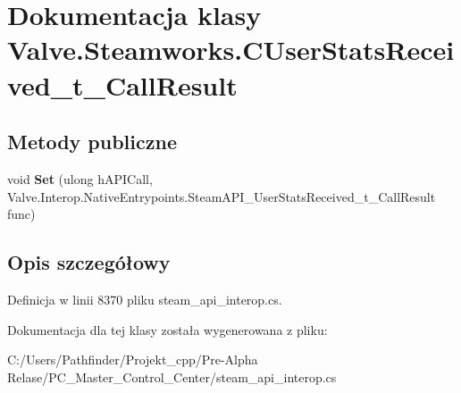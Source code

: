 \hypertarget{class_valve_1_1_steamworks_1_1_c_user_stats_received__t___call_result}{}\section{Dokumentacja klasy Valve.\+Steamworks.\+C\+User\+Stats\+Received\+\_\+t\+\_\+\+Call\+Result}
\label{class_valve_1_1_steamworks_1_1_c_user_stats_received__t___call_result}
\subsection*{Metody publiczne}
\begin{DoxyCompactItemize}
\item 
\mbox{\label{class_valve_1_1_steamworks_1_1_c_user_stats_received__t___call_result_a797ec2fe3f2ff42b6265a14ad4b9b7bf}} 
void {\bfseries Set} (ulong h\+A\+P\+I\+Call, Valve.\+Interop.\+Native\+Entrypoints.\+Steam\+A\+P\+I\+\_\+\+User\+Stats\+Received\+\_\+t\+\_\+\+Call\+Result func)
\end{DoxyCompactItemize}


\subsection{Opis szczegółowy}


Definicja w linii 8370 pliku steam\+\_\+api\+\_\+interop.\+cs.



Dokumentacja dla tej klasy została wygenerowana z pliku\+:\begin{DoxyCompactItemize}
\item 
C\+:/\+Users/\+Pathfinder/\+Projekt\+\_\+cpp/\+Pre-\/\+Alpha Relase/\+P\+C\+\_\+\+Master\+\_\+\+Control\+\_\+\+Center/steam\+\_\+api\+\_\+interop.\+cs\end{DoxyCompactItemize}
